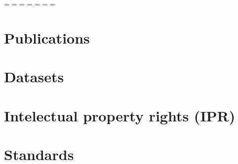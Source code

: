 
\setcounter{chapter}{0}
\setcounter{figure}{0}




\newpage
\setparttableofcontents
\parttoc %


\partlof %


\partlot %
\newpage

\color{magenta}%





\newpage
\paperwidth=\pdfpageheight
\paperheight=\pdfpagewidth
\pdfpageheight=\paperheight
\pdfpagewidth=\paperwidth
\headwidth=\textheight
\begingroup
    \vsize=\textwidth
    \hsize=\textheight







\section{Publications}

\section{Datasets}

\section{Intelectual property rights (IPR)}

\section{Standards}

